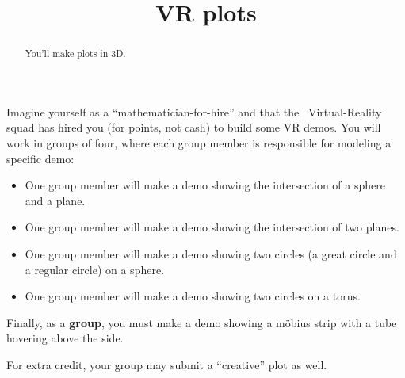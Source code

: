 \documentclass{ximera}
\title{VR plots}
\begin{document}
\begin{abstract}
  You'll make plots in 3D.
\end{abstract}
\maketitle

Imagine yourself as a ``mathematician-for-hire'' and that the
\mooculus\ Virtual-Reality squad has hired you (for points, not cash)
to build some VR demos. You will work in groups of four, where each
group member is responsible for modeling a specific demo:
\begin{itemize}
\item One group member will make a demo showing the intersection of a
  sphere and a plane.
\item One group member will make a demo showing the intersection of
  two planes.
\item One group member will make a demo showing two circles (a great
  circle and a regular circle) on a sphere.
\item One group member will make a demo showing two circles on a
  torus.
\end{itemize}
Finally, as a \textbf{group}, you must make a demo showing a m\"obius
strip with a tube hovering above the side.

For extra credit, your group may submit a ``creative'' plot as well.
\end{document}
